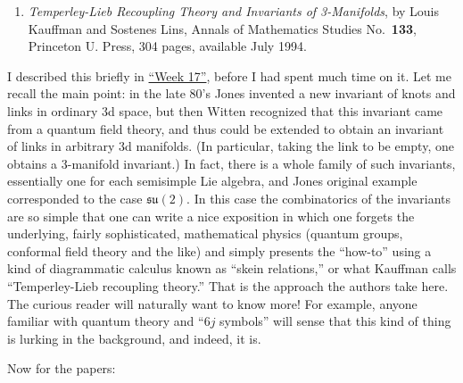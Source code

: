 \documentclass{article}
\def\tightlist{}
\renewcommand{\texttt}[1]{%
  \begingroup
  \ttfamily
  \begingroup\lccode`~=`/\lowercase{\endgroup\def~}{/\discretionary{}{}{}}%
  \begingroup\lccode`~=`[\lowercase{\endgroup\def~}{[\discretionary{}{}{}}%
  \begingroup\lccode`~=`.\lowercase{\endgroup\def~}{.\discretionary{}{}{}}%
  \catcode`/=\active\catcode`[=\active\catcode`.=\active
  \scantokens{#1\noexpand}%
  \endgroup
}
\begin{document}
\begin{enumerate}
\def\labelenumi{\arabic{enumi})}
\setcounter{enumi}{2}
\tightlist
\item
  \emph{Temperley-Lieb Recoupling Theory and Invariants of 3-Manifolds},
  by Louis Kauffman and Sostenes Lins, Annals of Mathematics Studies
  No.~\textbf{133}, Princeton U. Press, 304 pages, available July 1994.
\end{enumerate}

I described this briefly in \protect\hyperlink{week17}{``Week 17''},
before I had spent much time on it. Let me recall the main point: in the
late 80's Jones invented a new invariant of knots and links in ordinary
3d space, but then Witten recognized that this invariant came from a
quantum field theory, and thus could be extended to obtain an invariant
of links in arbitrary 3d manifolds. (In particular, taking the link to
be empty, one obtains a 3-manifold invariant.) In fact, there is a whole
family of such invariants, essentially one for each semisimple Lie
algebra, and Jones original example corresponded to the case
\(\mathfrak{su}(2)\). In this case the combinatorics of the invariants
are so simple that one can write a nice exposition in which one forgets
the underlying, fairly sophisticated, mathematical physics (quantum
groups, conformal field theory and the like) and simply presents the
``how-to'' using a kind of diagrammatic calculus known as ``skein
relations,'' or what Kauffman calls ``Temperley-Lieb recoupling
theory.'' That is the approach the authors take here. The curious reader
will naturally want to know more! For example, anyone familiar with
quantum theory and ``\(6j\) symbols'' will sense that this kind of thing
is lurking in the background, and indeed, it is.

Now for the papers:

\end{document}

